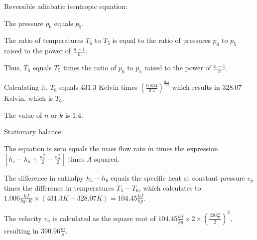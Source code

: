 Reversible adiabatic isentropic equation:

The pressure \( p_6 \) equals \( p_5 \).

The ratio of temperatures \( T_6 \) to \( T_5 \) is equal to the ratio of pressures \( p_6 \) to \( p_5 \) raised to the power of \( \frac{n-1}{n} \).

Thus, \( T_6 \) equals \( T_5 \) times the ratio of \( p_6 \) to \( p_5 \) raised to the power of \( \frac{n-1}{n} \).

Calculating it, \( T_6 \) equals \( 431.3 \) Kelvin times \( \left( \frac{0.834}{0.5} \right)^{\frac{0.4}{1.4}} \) which results in \( 328.07 \) Kelvin, which is \( T_6 \).

The value of \( n \) or \( k \) is \( 1.4 \).

Stationary balance:

The equation is zero equals the mass flow rate \( \dot{m} \) times the expression \( \left[ h_e - h_a + \frac{w_e^2}{2} - \frac{w_a^2}{2} \right] \) times \( \dot{A} \) squared.

The difference in enthalpy \( h_5 - h_6 \) equals the specific heat at constant pressure \( c_p \) times the difference in temperatures \( T_5 - T_6 \), which calculates to \( 1.006 \frac{kJ}{kg \cdot K} \times (431.3 K - 328.07 K) = 104.45 \frac{kJ}{kg} \).

The velocity \( v_a \) is calculated as the square root of \( 104.45 \frac{kJ}{kg} \times 2 \times \left( \frac{220 \frac{m}{s}}{2} \right)^2 \), resulting in \( 390.96 \frac{m}{s} \).